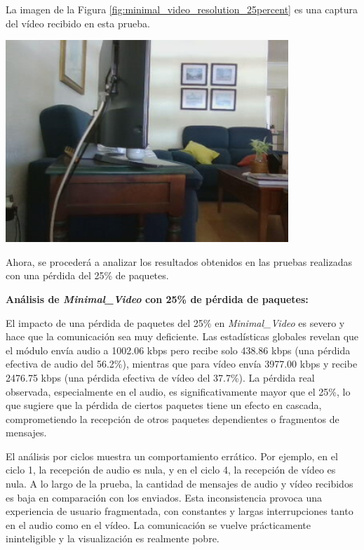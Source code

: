 \newpage

La imagen de la Figura \ref{fig:minimal_video_resolution_25percent} es una captura del vídeo recibido en esta prueba.
\begin{center}
  \includegraphics[width = 0.8\textwidth]{images/VideoRecibido8.3.png}
  \label{fig:minimal_video_resolution_25percent}
\end{center}

\newpage

Ahora, se procederá a analizar los resultados obtenidos en las pruebas realizadas con una pérdida del 25\% de paquetes.
\vspace{\baselineskip}

\textbf{Análisis de \textit{Minimal\_Video} con 25\% de pérdida de paquetes:}
\vspace{\baselineskip}

El impacto de una pérdida de paquetes del 25\% en \textit{Minimal\_Video} es severo y hace que la comunicación sea muy deficiente. Las estadísticas globales revelan que el módulo envía audio a 1002.06 kbps pero recibe solo 438.86 kbps (una pérdida efectiva de audio del 56.2\%), mientras que para vídeo envía 3977.00 kbps y recibe 2476.75 kbps (una pérdida efectiva de vídeo del 37.7\%). La pérdida real observada, especialmente en el audio, es significativamente mayor que el 25\%, lo que sugiere que la pérdida de ciertos paquetes tiene un efecto en cascada, comprometiendo la recepción de otros paquetes dependientes o fragmentos de mensajes.
\vspace{\baselineskip}

El análisis por ciclos muestra un comportamiento errático. Por ejemplo, en el ciclo 1, la recepción de audio es nula, y en el ciclo 4, la recepción de vídeo es nula. A lo largo de la prueba, la cantidad de mensajes de audio y vídeo recibidos es baja en comparación con los enviados. Esta inconsistencia provoca una experiencia de usuario fragmentada, con constantes y largas interrupciones tanto en el audio como en el vídeo. La comunicación se vuelve prácticamente ininteligible y la visualización es realmente pobre.


